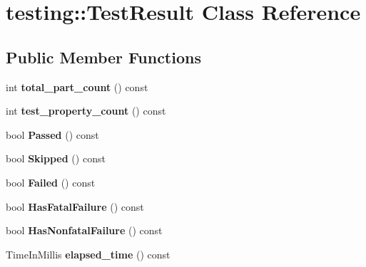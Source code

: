 \hypertarget{classtesting_1_1TestResult}{}\section{testing\+:\+:Test\+Result Class Reference}
\label{classtesting_1_1TestResult}
\subsection*{Public Member Functions}
\begin{DoxyCompactItemize}
\item 
\mbox{\label{classtesting_1_1TestResult_a6174aa4019dcda7c34d776b5741c9032}} 
int {\bfseries total\+\_\+part\+\_\+count} () const
\item 
\mbox{\label{classtesting_1_1TestResult_afe4523257bbea8bc63b0950b702790be}} 
int {\bfseries test\+\_\+property\+\_\+count} () const
\item 
\mbox{\label{classtesting_1_1TestResult_acf7e6e72f05a0545c48ea48e7f8851df}} 
bool {\bfseries Passed} () const
\item 
\mbox{\label{classtesting_1_1TestResult_a4c9e954e0f8c1386206f2e6208c45244}} 
bool {\bfseries Skipped} () const
\item 
\mbox{\label{classtesting_1_1TestResult_afacc37e8b43c8574e4101bc61723c769}} 
bool {\bfseries Failed} () const
\item 
\mbox{\label{classtesting_1_1TestResult_a30e00d4076ae07fb5ad7b623d9dc1fe4}} 
bool {\bfseries Has\+Fatal\+Failure} () const
\item 
\mbox{\label{classtesting_1_1TestResult_a510564fa67b485ed4589a259f2a032d6}} 
bool {\bfseries Has\+Nonfatal\+Failure} () const
\item 
\mbox{\label{classtesting_1_1TestResult_a717e05e00d4af5cb809433e343ab63af}} 
Time\+In\+Millis {\bfseries elapsed\+\_\+time} () const
\item 

\end{DoxyCompactItemize}
